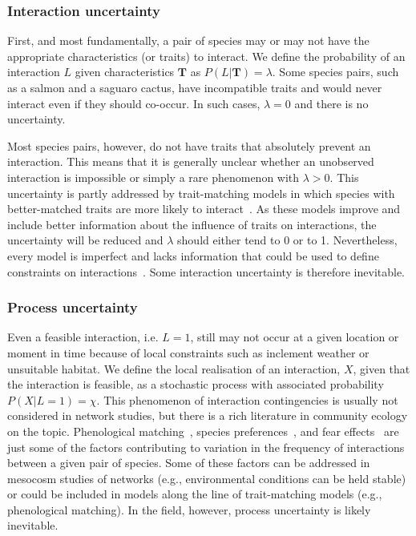 \documentclass[12pt]{article}
\begin{document}
\begin{spacing}{2.0}
        \subsubsection*{Interaction uncertainty} 

          First, and most fundamentally, a pair of species may or may not have the appropriate characteristics (or traits) to interact. We define the probability of an interaction $L$ given characteristics $\mathbf{T}$ as $P(L | \mathbf{T})=\lambda$. Some species pairs, such as a salmon and a saguaro cactus, have incompatible traits and would never interact even if they should co-occur. In such cases, $\lambda = 0$ and there is no uncertainty. 


          Most species pairs, however, do not have traits that absolutely prevent an interaction. This means that it is generally unclear whether an unobserved interaction is impossible or simply a rare phenomenon with $\lambda>0$. This uncertainty is partly addressed by trait-matching models in which species with better-matched traits are more likely to interact~\citep{Bartomeus2016}. As these models improve and include better information about the influence of traits on interactions, the uncertainty will be reduced and $\lambda$ should either tend to 0 or to 1. Nevertheless, every model is imperfect and lacks information that could be used to define constraints on interactions~\citep{Dormann2017}. Some interaction uncertainty is therefore inevitable.


        \subsubsection*{Process uncertainty} 

         Even a feasible interaction, i.e. $L=1$, still may not occur at a given location or moment in time because of local constraints such as inclement weather or unsuitable habitat. We define the local realisation of an interaction, $X$, given that the interaction is feasible, as a stochastic process with associated probability $P(X|L=1)=\chi$. This phenomenon of interaction contingencies is usually not considered in network studies, but there is a rich literature in community ecology  on the topic. Phenological matching~\citep{MillerRushing2010,Gezon2016}, species preferences~\citep{Pires2011,Novak2015,Coux2016}, and fear effects~\citep{Luttbeg2005,Wirsing2008} are just some of the factors contributing to variation in the frequency of interactions between a given pair of species. Some of these factors can be addressed in mesocosm studies of networks (e.g., environmental conditions can be held stable) or could be included in models along the line of trait-matching models (e.g., phenological matching). In the field, however, process uncertainty is likely inevitable.



\end{spacing}
\end{document}
